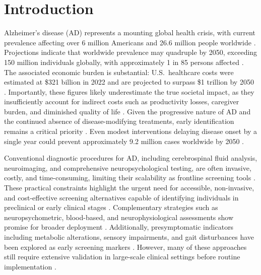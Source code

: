\documentclass[final,5p,times]{elsarticle}
\begin{document}


\section{Introduction}
\label{sec1}

Alzheimer's disease (AD) represents a mounting global health crisis, with current prevalence affecting over 6 million Americans and 26.6 million people worldwide \cite{Skaria2022}. Projections indicate that worldwide prevalence may quadruple by 2050, exceeding 150 million individuals globally, with approximately 1 in 85 persons affected \cite{Twiss2025}. The associated economic burden is substantial: U.S.\ healthcare costs were estimated at \$321 billion in 2022 and are projected to surpass \$1 trillion by 2050 \cite{Skaria2022}. Importantly, these figures likely underestimate the true societal impact, as they insufficiently account for indirect costs such as productivity losses, caregiver burden, and diminished quality of life \cite{ElHayek2019}. Given the progressive nature of AD and the continued absence of disease-modifying treatments, early identification remains a critical priority \cite{Skaria2022}. Even modest interventions delaying disease onset by a single year could prevent approximately 9.2 million cases worldwide by 2050 \cite{Brookmeyer2007}.

Conventional diagnostic procedures for AD, including cerebrospinal fluid analysis, neuroimaging, and comprehensive neuropsychological testing, are often invasive, costly, and time-consuming, limiting their scalability as frontline screening tools \cite{Laske2015}. These practical constraints highlight the urgent need for accessible, non-invasive, and cost-effective screening alternatives capable of identifying individuals in preclinical or early clinical stages \cite{Ahmad2023}. Complementary strategies such as neuropsychometric, blood-based, and neurophysiological assessments show promise for broader deployment \cite{Laske2015,Ahmad2023}. Additionally, presymptomatic indicators including metabolic alterations, sensory impairments, and gait disturbances have been explored as early screening markers \cite{BesinHumardani2024}. However, many of these approaches still require extensive validation in large-scale clinical settings before routine implementation \cite{Ahmad2023}.
\end{document}
